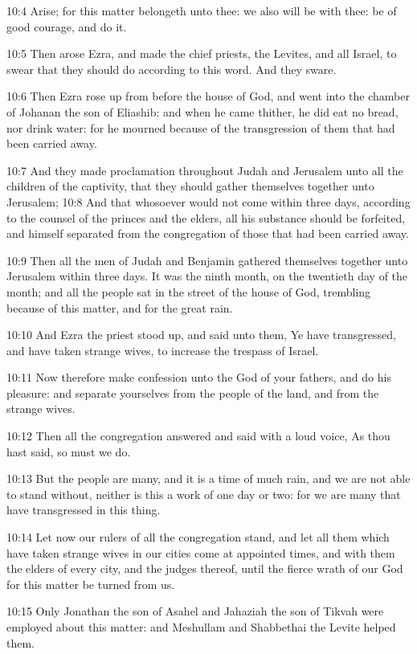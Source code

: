 10:4 Arise; for this matter belongeth unto thee: we also will be with
thee: be of good courage, and do it.

10:5 Then arose Ezra, and made the chief priests, the Levites, and all
Israel, to swear that they should do according to this word. And they
sware.

10:6 Then Ezra rose up from before the house of God, and went into the
chamber of Johanan the son of Eliashib: and when he came thither, he
did eat no bread, nor drink water: for he mourned because of the
transgression of them that had been carried away.

10:7 And they made proclamation throughout Judah and Jerusalem unto
all the children of the captivity, that they should gather themselves
together unto Jerusalem; 10:8 And that whosoever would not come within
three days, according to the counsel of the princes and the elders,
all his substance should be forfeited, and himself separated from the
congregation of those that had been carried away.

10:9 Then all the men of Judah and Benjamin gathered themselves
together unto Jerusalem within three days. It was the ninth month, on
the twentieth day of the month; and all the people sat in the street
of the house of God, trembling because of this matter, and for the
great rain.

10:10 And Ezra the priest stood up, and said unto them, Ye have
transgressed, and have taken strange wives, to increase the trespass
of Israel.

10:11 Now therefore make confession unto the \LORD God of your fathers,
and do his pleasure: and separate yourselves from the people of the
land, and from the strange wives.

10:12 Then all the congregation answered and said with a loud voice,
As thou hast said, so must we do.

10:13 But the people are many, and it is a time of much rain, and we
are not able to stand without, neither is this a work of one day or
two: for we are many that have transgressed in this thing.

10:14 Let now our rulers of all the congregation stand, and let all
them which have taken strange wives in our cities come at appointed
times, and with them the elders of every city, and the judges thereof,
until the fierce wrath of our God for this matter be turned from us.

10:15 Only Jonathan the son of Asahel and Jahaziah the son of Tikvah
were employed about this matter: and Meshullam and Shabbethai the
Levite helped them.

